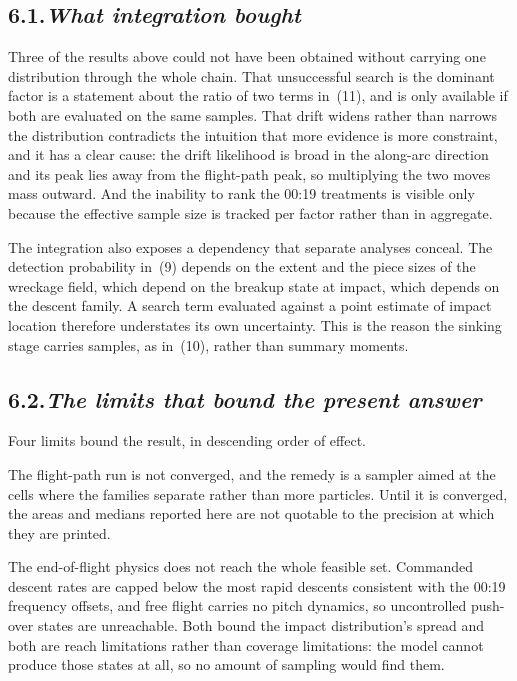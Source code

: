 \documentclass[12pt,a4paper]{article}
\begin{document}
\subsection*{6.1.\quad \textit{What integration bought}}

Three of the results above could not have been obtained without carrying one distribution
through the whole chain. That unsuccessful search is the dominant factor is a statement about the
ratio of two terms in~(11), and is only available if both are evaluated on the same samples. That
drift widens rather than narrows the distribution contradicts the intuition that more evidence is
more constraint, and it has a clear cause: the drift likelihood is broad in the along-arc
direction and its peak lies away from the flight-path peak, so multiplying the two moves mass
outward. And the inability to rank the 00:19 treatments is visible only because the effective
sample size is tracked per factor rather than in aggregate.

The integration also exposes a dependency that separate analyses conceal. The detection
probability in~(9) depends on the extent and the piece sizes of the wreckage field, which depend
on the breakup state at impact, which depends on the descent family. A search term evaluated
against a point estimate of impact location therefore understates its own uncertainty. This is
the reason the sinking stage carries samples, as in~(10), rather than summary moments.

\subsection*{6.2.\quad \textit{The limits that bound the present answer}}

Four limits bound the result, in descending order of effect.

The flight-path run is not converged, and the remedy is a sampler aimed at the cells where the
families separate rather than more particles. Until it is converged, the areas and medians
reported here are not quotable to the precision at which they are printed.

The end-of-flight physics does not reach the whole feasible set. Commanded descent rates are
capped below the most rapid descents consistent with the 00:19 frequency offsets, and free
flight carries no pitch dynamics, so uncontrolled push-over states are unreachable. Both bound
the impact distribution's spread and both are reach limitations rather than coverage
limitations: the model cannot produce those states at all, so no amount of sampling would find
them.
\end{document}
